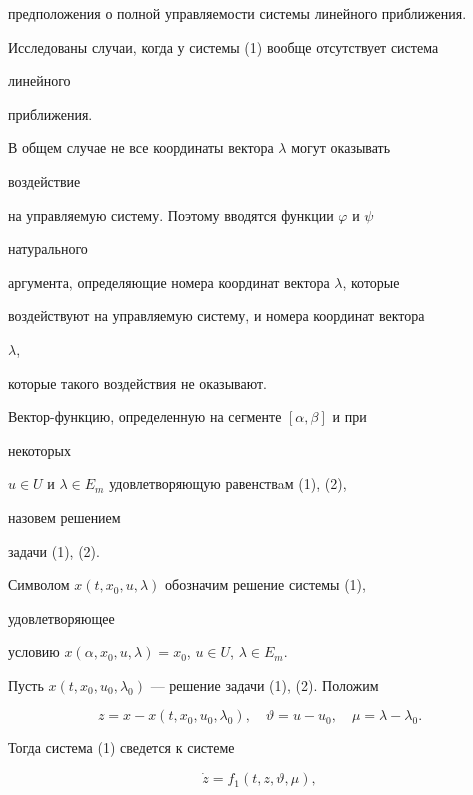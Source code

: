 предположения о полной управляемости системы линейного приближения. 


Исследованы случаи, когда у системы (1) вообще отсутствует система 


линейного 


приближения. 


 


В общем случае не все координаты вектора $\lambda$ могут оказывать 


воздействие 


на управляемую систему. Поэтому вводятся функции $\varphi$ и $\psi$ 


натурального 


аргумента, определяющие номера координат вектора $\lambda$, которые 


воздействуют на управляемую систему, и номера координат вектора 


$\lambda$, 


которые такого воздействия не оказывают. 


 


Вектор-функцию, определенную на сегменте $[\alpha,\beta]$ и при 


некоторых 


$u\in U$ и $\lambda\in E_m$ удовлетворяющую равенствaм (1), (2), 


назовем решением 


задачи (1), (2). 


Символом $x(t,x_0,u,\lambda)$ обозначим решение системы (1), 


удовлетворяющее 


условию $x(\alpha,x_0,u,\lambda)=x_0$, $u\in U$, $\lambda\in E_m$. 


 


Пусть $x(t,x_0,u_0,\lambda_0)$ --- решение задачи (1), (2). Положим 


\begin{equation} 


z=x-x(t,x_0,u_0,\lambda_0),\quad \vartheta=u-u_0,\quad 


\mu=\lambda-\lambda_0. 


\end{equation} 


Тогда система (1) сведется к системе 


\begin{equation} 


\Dot z=f_1(t,z,\vartheta,\mu), 


\end{equation} 


